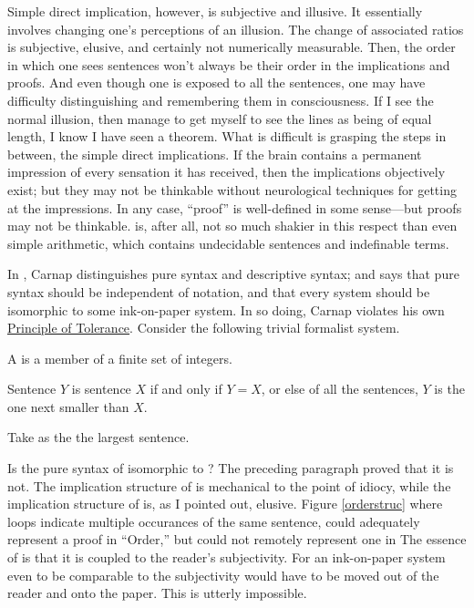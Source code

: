 Simple direct implication, however, is subjective and illusive. It 
essentially involves changing one's perceptions of an illusion. The change of 
associated ratios is subjective, elusive, and certainly not numerically 
measurable. Then, the order in which one sees sentences won't always be 
their order in the implications and proofs. And even though one is exposed 
to all the sentences, one may have difficulty distinguishing and remembering 
them in consciousness. If I see the normal illusion, then manage to get 
myself to see the lines as being of equal length, I know I have seen a 
theorem. What is difficult is grasping the steps in between, the simple direct 
implications. If the brain contains a permanent impression of every sensation 
it has received, then the implications objectively exist; but they may not be 
thinkable without neurological techniques for getting at the impressions. In 
any case, \enquote{proof} is well-defined in some sense---but proofs may not be 
thinkable.  is, after all, not so much shakier in this respect than 
even simple arithmetic, which contains undecidable sentences and 
indefinable terms. 

In , Carnap distinguishes pure syntax 
and descriptive syntax; and says that pure syntax should be independent of 
notation, and that every system should be isomorphic to some ink-on-paper 
system. In so doing, Carnap violates his own \uline{Principle of Tolerance}. Consider 
the following trivial formalist system. 


\begin{sysrules}
A  is a member of a finite set of integers. 

Sentence $Y$ is  sentence $X$ if and only if $Y=X$, or else of all the 
sentences, $Y$ is the one next smaller than $X$. 

Take as the  the largest sentence. 
\end{sysrules}

Is the pure syntax of  isomorphic to ? The preceding 
paragraph proved that it is not. The implication structure of  is 
mechanical to the point of idiocy, while the implication structure of 
 is, as I pointed out, elusive. Figure \ref{orderstruc}
where loops indicate multiple occurances of the same sentence, could 
adequately represent a proof in \enquote{Order,} but could not remotely represent 
one in  The essence of  is that it is coupled to the 
reader's subjectivity. For an ink-on-paper system even to be comparable to 
 the subjectivity would have to be moved out of the reader and 
onto the paper. This is utterly impossible. 


